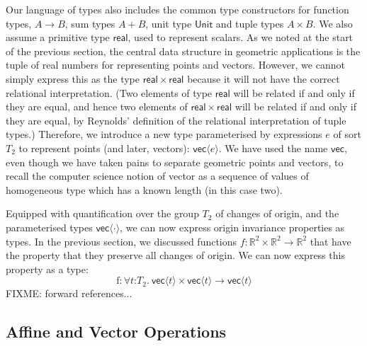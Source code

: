 Our language of types also includes the common type constructors for
function types, $A \to B$, sum types $A + B$, unit type
$\mathsf{Unit}$ and tuple types $A \times B$. We also assume a
primitive type $\mathsf{real}$, used to represent scalars. As we noted
at the start of the previous section, the central data structure in
geometric applications is the tuple of real numbers for representing
points and vectors. However, we cannot simply express this as the type
$\mathsf{real} \times \mathsf{real}$ because it will not have the
correct relational interpretation. (Two elements of type
$\mathsf{real}$ will be related if and only if they are equal, and
hence two elements of $\mathsf{real} \times \mathsf{real}$ will be
related if and only if they are equal, by Reynolds' definition of the
relational interpretation of tuple types.) Therefore, we introduce a
new type parameterised by expressions $e$ of sort $T_2$ to represent
points (and later, vectors): $\mathsf{vec}\langle e \rangle$. We have
used the name $\mathsf{vec}$, even though we have taken pains to
separate geometric points and vectors, to recall the computer science
notion of vector as a sequence of values of homogeneous type which has
a known length (in this case two).


Equipped with quantification over the group $T_2$ of changes of
origin, and the parameterised types $\mathsf{vec}\langle \cdot
\rangle$, we can now express origin invariance properties as types. In
the previous section, we discussed functions $f : \mathbb{R}^2 \times
\mathbb{R}^2 \to \mathbb{R}^2$ that have the property that they
preserve all changes of origin. We can now express this property as a
type:
\begin{displaymath}
  \mathrm{f} : \forall t \mathord: T_2.\ \mathsf{vec}\langle t \rangle \times \mathsf{vec}\langle t \rangle \to \mathsf{vec}\langle t \rangle
\end{displaymath}
FIXME: forward references...

\subsection{Affine and Vector Operations}
\label{sec:affine-vector-ops}

